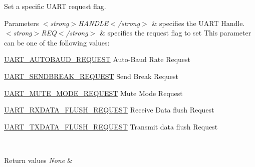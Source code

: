 Set a specific U\+A\+RT request flag. 


\begin{DoxyParams}{Parameters}
{\em $<$strong$>$\+H\+A\+N\+D\+L\+E$<$/strong$>$} & specifies the U\+A\+RT Handle. \\
\hline
{\em $<$strong$>$\+R\+E\+Q$<$/strong$>$} & specifies the request flag to set This parameter can be one of the following values\+: \begin{DoxyItemize}
\item \mbox{\hyperlink{group___u_a_r_t___request___parameters_ga8cdce81a934ab7d0c2eecb4d85300d4e}{U\+A\+R\+T\+\_\+\+A\+U\+T\+O\+B\+A\+U\+D\+\_\+\+R\+E\+Q\+U\+E\+ST}} Auto-\/\+Baud Rate Request \item \mbox{\hyperlink{group___u_a_r_t___request___parameters_ga52ced88a9f4ce90f3725901cf91f38b3}{U\+A\+R\+T\+\_\+\+S\+E\+N\+D\+B\+R\+E\+A\+K\+\_\+\+R\+E\+Q\+U\+E\+ST}} Send Break Request \item \mbox{\hyperlink{group___u_a_r_t___request___parameters_gadd5f511803928fd042f7fc6ef99f9cfb}{U\+A\+R\+T\+\_\+\+M\+U\+T\+E\+\_\+\+M\+O\+D\+E\+\_\+\+R\+E\+Q\+U\+E\+ST}} Mute Mode Request \item \mbox{\hyperlink{group___u_a_r_t___request___parameters_gaf2ee2d4b1bdcbc7772ddc0da89566936}{U\+A\+R\+T\+\_\+\+R\+X\+D\+A\+T\+A\+\_\+\+F\+L\+U\+S\+H\+\_\+\+R\+E\+Q\+U\+E\+ST}} Receive Data flush Request \item \mbox{\hyperlink{group___u_a_r_t___request___parameters_gafecbd800f456ed666a42ac0842cd2c4b}{U\+A\+R\+T\+\_\+\+T\+X\+D\+A\+T\+A\+\_\+\+F\+L\+U\+S\+H\+\_\+\+R\+E\+Q\+U\+E\+ST}} Transmit data flush Request \end{DoxyItemize}
\\
\hline
\end{DoxyParams}

\begin{DoxyRetVals}{Return values}
{\em None} & \\
\hline
\end{DoxyRetVals}
